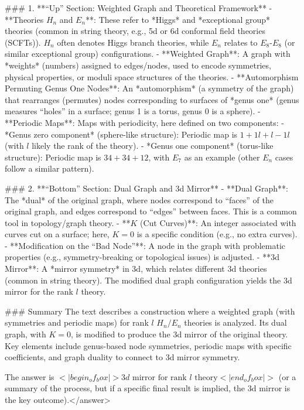 ### 1. **“Up” Section: Weighted Graph and Theoretical Framework**  
- **Theories \( H_n \) and \( E_n \)**: These refer to *Higgs* and *exceptional group* theories (common in string theory, e.g., 5d or 6d conformal field theories (SCFTs)). \( H_n \) often denotes Higgs branch theories, while \( E_n \) relates to \( E_8 \)-\( E_8 \) (or similar exceptional group) configurations.  
- **Weighted Graph**: A graph with *weights* (numbers) assigned to edges/nodes, used to encode symmetries, physical properties, or moduli space structures of the theories.  
- **Automorphism Permuting Genus One Nodes**: An *automorphism* (a symmetry of the graph) that rearranges (permutes) nodes corresponding to surfaces of *genus one* (genus measures “holes” in a surface; genus 1 is a torus, genus 0 is a sphere).  
- **Periodic Maps**: Maps with periodicity, here defined on two components:  
  - *Genus zero component* (sphere-like structure): Periodic map is \( 1 + 1l + l-1l \) (with \( l \) likely the rank of the theory).  
  - *Genus one component* (torus-like structure): Periodic map is \( 34 + 34 + 12 \), with \( E_7 \) as an example (other \( E_n \) cases follow a similar pattern).  


### 2. **“Bottom” Section: Dual Graph and 3d Mirror**  
- **Dual Graph**: The *dual* of the original graph, where nodes correspond to “faces” of the original graph, and edges correspond to “edges” between faces. This is a common tool in topology/graph theory.  
- **\( K \) (Cut Curves)**: An integer associated with curves cut on a surface; here, \( K = 0 \) is a specific condition (e.g., no extra curves).  
- **Modification on the “Bad Node”**: A node in the graph with problematic properties (e.g., symmetry-breaking or topological issues) is adjusted.  
- **3d Mirror**: A *mirror symmetry* in 3d, which relates different 3d theories (common in string theory). The modified dual graph configuration yields the 3d mirror for the rank \( l \) theory.  


### Summary  
The text describes a construction where a weighted graph (with symmetries and periodic maps) for rank \( l \) \( H_n/E_n \) theories is analyzed. Its dual graph, with \( K = 0 \), is modified to produce the 3d mirror of the original theory. Key elements include genus-based node symmetries, periodic maps with specific coefficients, and graph duality to connect to 3d mirror symmetry.  

The answer is \(<|begin_of_box|>3d \text{ mirror for rank } l \text{ theory}<|end_of_box|>\) (or a summary of the process, but if a specific final result is implied, the 3d mirror is the key outcome).</answer>
